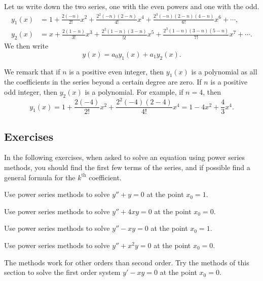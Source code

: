 \begin{example}
Let us write down the two series, one with the even powers and one with the
odd.
\begin{align*}
y_1(x) & = 
1+\frac{2(-n)}{2!} x^2 + \frac{2^2(-n)(2-n)}{4!} x^4 + 
\frac{2^3(-n)(2-n)(4-n)}{6!} x^6 + \cdots ,
\\
y_2(x) & = 
x+\frac{2(1-n)}{3!} x^3 + \frac{2^2(1-n)(3-n)}{5!} x^5 + 
\frac{2^3(1-n)(3-n)(5-n)}{7!} x^7 + \cdots .
\end{align*}
We then write
\begin{equation*}
y(x) = a_0 y_1(x) + a_1 y_2(x) .
\end{equation*}

We remark that if $n$ is a positive even integer, then $y_1(x)$ is a
polynomial as all the coefficients in the series beyond a certain
degree are zero.  If $n$ is a positive odd integer, then $y_2(x)$ is
a polynomial.  For example, if $n=4$, then
\begin{equation*}
y_1(x) = 1 + \frac{2(-4)}{2!} x^2 + \frac{2^2(-4)(2-4)}{4!} x^4
= 1 - 4x^2 + \frac{4}{3} x^4 .
\end{equation*}
\end{example}

\subsection{Exercises}

In the following exercises, when asked to solve an equation using power
series methods, you should find the first few terms of the series,
and if possible find a general formula for the $k^{\text{th}}$ coefficient.

\begin{exercise}
Use power series methods to solve $y''+y = 0$ at the point $x_0 = 1$.
\end{exercise}

\begin{exercise}
Use power series methods to solve $y''+4xy = 0$ at the point $x_0 = 0$.
\end{exercise}

\begin{exercise}
Use power series methods to solve $y''-xy = 0$ at the point $x_0 = 1$.
\end{exercise}

\begin{exercise}
Use power series methods to solve $y''+x^2y = 0$ at the point $x_0 = 0$.
\end{exercise}

\begin{exercise}
The methods work for other orders than second order.  Try the methods
of this section to solve the first order system $y'-xy = 0$ at
the point $x_0 = 0$.
\end{exercise}

